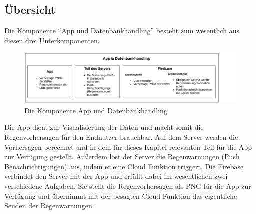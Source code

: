 \subsection{Übersicht}\label{übersicht}
Die Komponente “App und Datenbankhandling” besteht zum wesentlich aus diesen drei Unterkomponenten.  

\begin{figure}[h]
 \centering
 \includegraphics[width=1\textwidth,angle=0]{abb/KomponentenUebersicht.png}
 \caption[Komponentenübersicht App und Datenbankhandling]{Die Komponente App und Datenbankhandling}
\label{fig:Beschreibung}
\end{figure}

Die App dient zur Visualisierung der Daten und macht somit die Regenvorhersagen für den Endnutzer brauchbar. 
Auf dem Server werden die Vorhersagen berechnet und in dem für dieses Kapitel relevanten Teil
für die App zur Verfügung gestellt. 
Außerdem löst der Server die Regenwarnungen (Push Benachrichtigungen) aus, indem er eine Cloud Funktion triggert. 
Die Firebase verbindet den Server mit der App und erfüllt dabei im wesentlichen zwei verschiedene Aufgaben. 
Sie stellt die Regenvorhersagen als PNG für die App zur Verfügung und übernimmt mit der besagten Cloud Funktion das eigentliche Senden der Regenwarnungen. 
 
